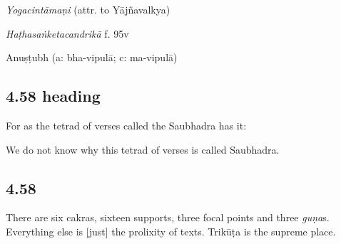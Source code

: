\begin{ekdosis}
\begin{testimonia}[hp04_057]
\emph{Yogacintāmaṇi} (attr. to Yājñavalkya)
\begin{versinnote}
\end{versinnote}

\emph{Haṭhasaṅketacandrikā} f. 95v
\begin{versinnote}
\end{versinnote}
\end{testimonia}


\begin{metre}[hp04_057]
Anuṣṭubh (a: bha-vipulā; c: ma-vipulā)
\end{metre}

\subsection*{4.58 heading}
\begin{translation}[hp04_058a]
For as the tetrad of verses called the Saubhadra has it:
\end{translation}

\begin{philcomm}[hp04_058a]
We do not know why this tetrad of verses is called Saubhadra.
\end{philcomm}

\subsection*{4.58}
\begin{translation}[hp04_058]
There are six cakras, sixteen supports, three focal points and three \emph{guṇa}s. Everything else is [just] the prolixity of texts. Trikūṭa is the supreme place.
\end{translation}



\end{ekdosis}
